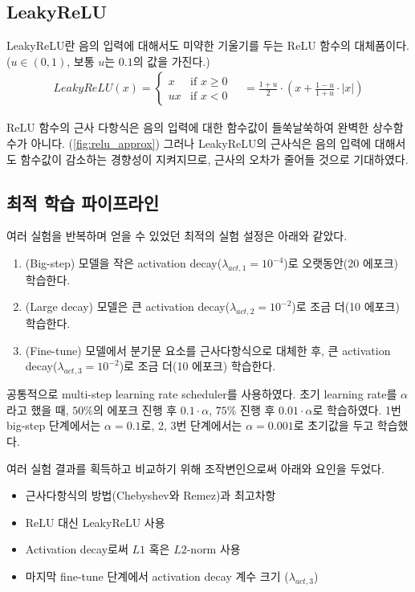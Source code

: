 \documentclass[a4paper, 11pt, chapterprefix=false]{report}
\begin{document}
\subsection{LeakyReLU}

LeakyReLU란 음의 입력에 대해서도 미약한 기울기를 두는 ReLU 함수의 대체품이다.
($u \in (0, 1)$, 보통 $u$는 $0.1$의 값을 가진다.)
\begin{gather*}
  LeakyReLU(x) = \left\{
    \begin{array}{ll}
      x & \text{if $x \geq 0$} \\
      ux & \text{if $x < 0$}
    \end{array}
  \right.
  \quad = \frac{1+u}{2} \cdot \left( x + \frac{1-u}{1+u} \cdot |x| \right)
\end{gather*}

ReLU 함수의 근사 다항식은 음의 입력에 대한 함수값이 들쑥날쑥하여 완벽한
상수함수가 아니다. (\autoref{fig:relu_approx}) 그러나 LeakyReLU의 근사식은 음의
입력에 대해서도 함수값이 감소하는 경향성이 지켜지므로, 근사의 오차가 줄어들 것으로
기대하였다.

\subsection{최적 학습 파이프라인}

여러 실험을 반복하며 얻을 수 있었던 최적의 실험 설정은 아래와 같았다.
\begin{enumerate}
  \item (Big-step) 모델을 작은 activation decay($\lambda_{act, 1} = 10^{-4}$)로 오랫동안(20 에포크) 학습한다.
  \item (Large decay) 모델은 큰 activation decay($\lambda_{act, 2} = 10^{-2}$)로 조금 더(10 에포크) 학습한다.
  \item (Fine-tune) 모델에서 분기문 요소를 근사다항식으로 대체한 후, 큰 activation decay($\lambda_{act, 3} = 10^{-2}$)로 조금 더(10 에포크) 학습한다.
\end{enumerate}
공통적으로 multi-step learning rate scheduler를 사용하였다. 초기 learning rate를
$\alpha$라고 했을 때, $50\%$의 에포크 진행 후 $0.1 \cdot \alpha$, $75\%$ 진행 후
$0.01 \cdot \alpha$로 학습하였다. 1번 big-step 단계에서는 $\alpha = 0.1$로, 2,
3번 단계에서는 $\alpha = 0.001$로 초기값을 두고 학습했다.

여러 실험 결과를 획득하고 비교하기 위해 조작변인으로써 아래와 요인을 두었다.
\begin{itemize}
  \item 근사다항식의 방법(Chebyshev와 Remez)과 최고차항
  \item ReLU 대신 LeakyReLU 사용
  \item Activation decay로써 $L1$ 혹은 $L2$-norm 사용
  \item 마지막 fine-tune 단계에서 activation decay 계수 크기 ($\lambda_{act, 3}$)
\end{itemize}
\end{document}

